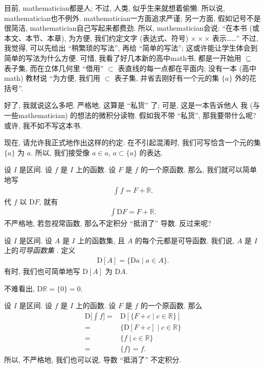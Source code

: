 目前, \gls{mathematician}都是人;
不过, 人类, 似乎生来就想着偷懒.
所以说, \gls{mathematician}也不例外.
\gls{mathematician}一方面追求严谨;
另一方面, 假如记号不是很简洁,
\gls{mathematician}自己写起来都费劲.
所以, \gls{mathematician}会说:
``在本书 (或本文、本节、本章), 为方便,
我们约定文字 (表达式、符号) $\times \times \times$ 表示……''
不过, 我觉得, 可以先给出 ``稍繁琐的写法'',
再给 ``简单的写法'';
这或许能让学生体会到简单的写法为什么方便.
可惜, 我看了好几本新的高中\gls{math}书,
都是一开始用 $\subseteq$ 表子集,
而在立体几何里 ``借用'' $\subset$ 表直线的每一点都在平面内;
没有一本 (高中\gls{math}) 教材说
``为方便, 我们用 $\subset$ 表子集,
并省去刚好有一个元的集 $\{ a \}$ 外的花括号''.

好了, 我就说这么多吧.
严格地, 这算是 ``私货'' 了;
可是, 这是一本告诉他人%
我 (与一些\gls{mathematician}) 的想法的微积分读物.
假如我不带 ``私货'', 那我要带什么呢?
或许, 我不如不写这本书.

现在, 请允许我正式地作出这样的约定:
在不引起混淆时, 我们可写恰含一个元的集 $\{ a \}$ 为 $a$.
所以, 我们接受像 $a \in a$, $a \subset \{ a \}$ 的表达.

设 $I$ 是区间.
设 $f$ 是 $I$ 上的函数.
设 $F$ 是 $f$ 的一个原函数.
那么, 我们就可以简单地写
\begin{align*}
    \int {f} = F + \mathbb{R}.
\end{align*}
代 $f$ 以 $\mathrm{D}F$, 就有
\begin{align*}
    \int {\mathrm{D}F} = F + \mathbb{R}.
\end{align*}
不严格地, 若忽视常函数, 那么不定积分 ``抵消了'' 导数.
反过来呢?

\begin{definition}
    设 $I$ 是区间.
    设 $A$ 是 $I$ 上的函数集, 且 $A$ 的每个元都是可导函数.
    我们说, $A$ 是 $I$ 上的\emph{可导函数集}%
    .
    定义
    \begin{align*}
        \mathrm{D} [A] = \{ \mathrm{D}a \mid a \in A \}.
    \end{align*}
    有时, 我们也可简单地写 $\mathrm{D}[A]$ 为 $\mathrm{D}A$.
\end{definition}

\begin{example}
    不难看出, $\mathrm{D} \mathbb{R} = \{ 0 \} = 0$.
\end{example}

设 $I$ 是区间.
设 $f$ 是 $I$ 上的函数.
设 $F$ 是 $f$ 的一个原函数.
那么
\begin{align*}
    \mathrm{D} \Bigg[ \int {f} \Bigg]
    = {} & \mathrm{D} [\{ F + c \mid \text{$c \in \mathbb{R}$} \}] \\
    = {} & \{ \mathrm{D}[F + c] \mid \text{$c \in \mathbb{R}$} \}  \\
    = {} & \{ f \mid \text{$c \in \mathbb{R}$} \}                  \\
    = {} & \{ f \}  = f.
\end{align*}
所以, 不严格地, 我们也可以说, 导数 ``抵消了'' 不定积分.

